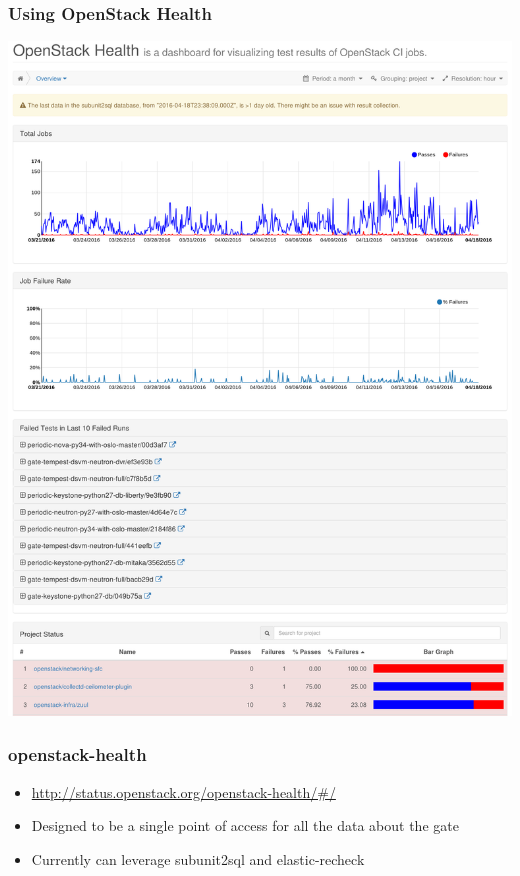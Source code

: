 \documentclass[aspectratio=43,11pt,hyperref={colorlinks=true}]{beamer}
\begin{document}
\begin{frame}
    \frametitle{Using OpenStack Health}
    \begin{center}
        \includegraphics[height=.9\textheight]{HomePage.png}
    \end{center}
\end{frame}

\begin{frame}
    \frametitle{openstack-health}
    \begin{itemize}
        \item \href{http://status.openstack.org/openstack-health/\#/}{http://status.openstack.org/openstack-health/\#/}
        \item Designed to be a single point of access for all the data about the gate
        \item Currently can leverage subunit2sql and elastic-recheck
    \end{itemize}
\end{frame}
\end{document}
